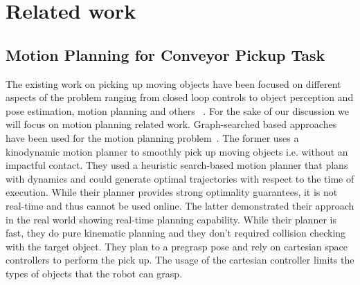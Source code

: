 \documentclass[conference]{IEEEtran}
\begin{document}
\section{Related work}
\subsection{Motion Planning for Conveyor Pickup Task}
The existing work on picking up moving objects have been focused on different aspects of the problem ranging from closed loop controls to object perception and pose estimation, motion planning and others~\cite{allen1993automated, han2019toward, stogl2017tracking, zhang2018gilbreth} . For the sake of our discussion we will focus on motion planning related work. Graph-searched based approaches have been used for the motion planning problem~\cite{cowley2013perception, menon2014motion}. The former uses a kinodynamic motion planner to smoothly pick up moving objects i.e. without an impactful contact. They used a heuristic search-based motion planner that plans with dynamics and could generate optimal trajectories with respect to the time of execution. While their planner provides strong optimality guarantees, it is not real-time and thus cannot be used online.
%
The latter demonstrated their approach in the real world showing real-time planning capability. While their planner is fast, they do pure kinematic planning and they don't required collision checking with the target object. They plan to a pregrasp pose and rely on cartesian space controllers to perform the pick up. The usage of the cartesian controller limits the types of objects that the robot can grasp.
\end{document}

